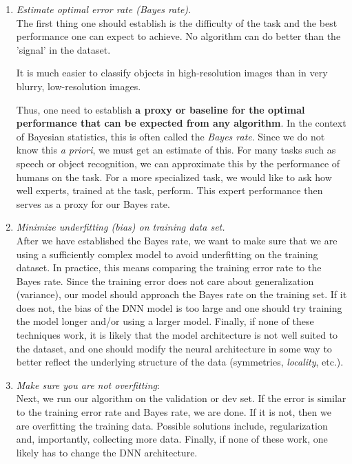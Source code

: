 \begin{enumerate}
\item \emph{Estimate optimal error rate (Bayes rate).}\\
The first thing one should establish is the difficulty of the task and the best performance one can expect to achieve. No algorithm can do better than the ’signal’ in the dataset. 
\begin{example}
	It is much easier to classify objects in high-resolution images than in very blurry, low-resolution images.
\end{example}
Thus, one need to establish \textbf{a proxy or baseline for the optimal performance that can be expected from any algorithm}. In the context of Bayesian statistics, this is often called the \emph{Bayes rate}. Since we do not know this \emph{a priori}, we must get an estimate of this. For many tasks such as speech or object recognition, we can approximate this by the performance of humans on the task. For a more specialized task, we would like to ask how well experts, trained at the task, perform. This expert performance then serves as a proxy for our Bayes rate.

\item \emph{Minimize underfitting (bias) on training data set.}\\
After we have established the Bayes rate, we want to make sure that we are using a sufficiently complex model to avoid underfitting on the training dataset. In practice, this means comparing the training error rate to the Bayes rate. Since the training error does not care about generalization (variance), our model should approach the Bayes rate on the training set. If it does not, the bias of the DNN model is too large and one should try training the model longer and/or using a larger model. Finally, if none of these techniques work, it is likely that the model architecture is not well suited to the dataset, and one should modify the neural architecture in some way to better reflect the underlying structure of the data (symmetries, \emph{locality}, etc.).
\item \emph{Make sure you are not overfitting}:\\
Next, we run our algorithm on the validation or dev set. If the error is similar to the training error rate and Bayes rate, we are done. If it is not, then we are overfitting the training data. Possible solutions include, regularization and, importantly, collecting more data. Finally, if none of these work, one likely has to change the DNN architecture.
\end{enumerate}

